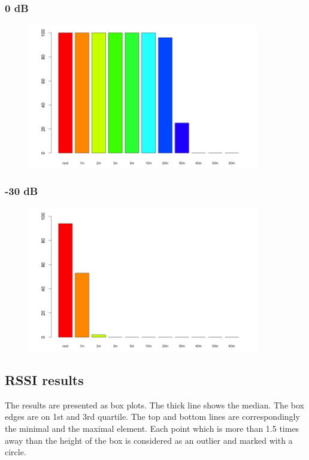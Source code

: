 \subsubsection{0 dB}

\begin{figure}[H]
  \centering
  \includegraphics[width=0.9\textwidth]{img/tests/range/db_00.png}
\end{figure}

\subsubsection{-30 dB}

\begin{figure}[H]
  \centering
  \includegraphics[width=0.9\textwidth]{img/tests/range/db_m30.png}
\end{figure}

\subsection{RSSI results}


The results are presented as box plots.
The thick line shows the median.
The box edges are on 1st and 3rd quartile.
The top and bottom lines are correspondingly the minimal and the maximal element.
Each point which is more than 1.5 times away than the height of the box is considered as an outlier and marked with a circle.

